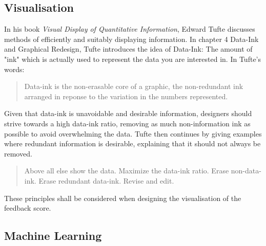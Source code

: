\subsection{Visualisation}
In his book {\it Visual Display of Quantitative Information}\cite{visual_explanations}, Edward Tufte discusses methods of efficiently and suitably displaying information. In chapter 4 Data-Ink and Graphical Redesign, Tufte introduces the idea of Data-Ink: The amount of "ink" which is actually used to represent the data you are interested in. In Tufte's words:

\begin{quote}Data-ink is the non-erasable core of a graphic, the non-redundant ink arranged in reponse to the variation in the numbers represented.
\end{quote}
Given that data-ink is unavoidable and desirable information, designers should strive towards a high data-ink ratio, removing as much non-information ink as possible to avoid overwhelming the data. Tufte then continues by giving examples where redundant information is desirable, explaining that it should not always be removed.

\begin{verse}Above all else show the data.
	Maximize the data-ink ratio.
	Erase non-data-ink.
	Erase redundant data-ink.
Revise and edit.
\end{verse}

These principles shall be considered when designing the visualisation of the feedback score.

\subsection{Machine Learning}
